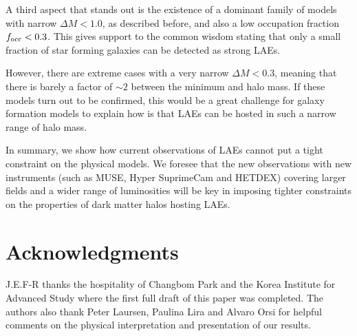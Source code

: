 \documentclass[usenatbib]{mn2e}
\begin{document}
A third aspect that stands out is the existence of a dominant family
of models with narrow $\Delta M<1.0$, as described before, and also a
low occupation fraction $f_{\rm occ}<0.3$. This gives support to the
common wisdom stating that only a small fraction of star forming
galaxies can be detected as strong LAEs. 

However, there are extreme cases with a very narrow $\Delta M<0.3$, meaning that
there is barely a factor of $\sim 2$ between the minimum and halo
mass. If these models turn out to be confirmed, this would be a great
challenge for galaxy formation models to explain how is that LAEs can
be hosted in such a narrow range of halo mass.

In summary, we show how current observations of LAEs cannot
put a tight constraint on the physical models. We  foresee that the
new observations with new instruments (such as MUSE, Hyper SuprimeCam
and HETDEX) covering larger fields and a wider range of luminosities
will be key in imposing tighter constraints on the properties of dark
matter halos hosting LAEs.   


\section*{Acknowledgments} 
J.E.F-R thanks the hospitality of Changbom Park and the Korea
Institute for Advanced Study where the first full draft of this paper
was completed. The authors also thank Peter Laursen, Paulina Lira and
Alvaro Orsi for helpful comments on the physical interpretation and
presentation of our results. 
\end{document}
